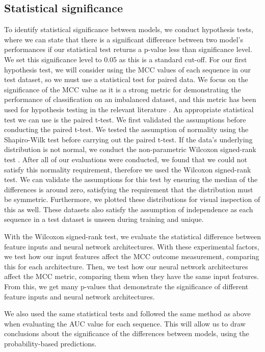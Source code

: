 \documentclass{l4proj}
\begin{document}
\subsection{Statistical significance}

To identify statistical significance between models, we conduct hypothesis tests, where we can state that there is a significant difference between two model’s performances if our statistical test returns a p-value less than significance level. We set this significance level to 0.05 as this is a standard cut-off. For our first hypothesis test, we will consider using the MCC values of each sequence in our test dataset, so we must use a statistical test for paired data. We focus on the significance of the MCC value as it is a strong metric for demonstrating the performance of classification on an imbalanced dataset, and this metric has been used for hypothesis testing in the relevant literature \citep{Zhao:22}. An appropriate statistical test we can use is the paired t-test. We first validated the assumptions before conducting the paired t-test. We tested the assumption of normality using the Shapiro-Wilk test \citep{Shapiro:wiki} before carrying out the paired t-test. If the data’s underlying distribution is not normal, we conduct the non-parametric Wilcoxon signed-rank test \citep{Wilcoxon:wiki}. After all of our evaluations were conducted, we found that we could not satisfy this normality requirement, therefore we used the Wilcoxon signed-rank test. We can validate the assumptions for this test by ensuring the median of the differences is around zero, satisfying the requirement that the distribution must be symmetric. Furthermore, we plotted these distributions for visual inspection of this as well. These datasets also satisfy the assumption of independence as each sequence in a test dataset is unseen during training and unique.

With the Wilcoxon signed-rank test, we evaluate the statistical difference between feature inputs and neural network architectures. With these experimental factors, we test how our input features affect the MCC outcome measurement, comparing this for each architecture. Then, we test how our neural network architectures affect the MCC metric, comparing them when they have the same input features. From this, we get many p-values that demonstrate the significance of different feature inputs and neural network architectures.

We also used the same statistical tests and followed the same method as above when evaluating the AUC value for each sequence. This will allow us to draw conclusions about the significance of the differences between models, using the probability-based predictions.
\end{document}
